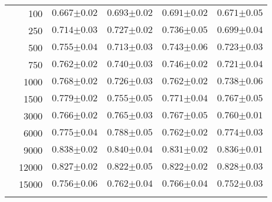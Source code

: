 \begin{landscape}
\begin{table}[p]
\begin{tabular}{cr| *{4}{C{2cm}}}
        & 100 & $0.667{\scriptscriptstyle\pm0.02}$ & $0.693{\scriptscriptstyle\pm0.02}$ & $0.691{\scriptscriptstyle\pm0.02}$ & $0.671{\scriptscriptstyle\pm0.05}$ \\
        & 250 & $0.714{\scriptscriptstyle\pm0.03}$ & $0.727{\scriptscriptstyle\pm0.02}$ & $0.736{\scriptscriptstyle\pm0.05}$ & $0.699{\scriptscriptstyle\pm0.04}$ \\
        & 500 & $0.755{\scriptscriptstyle\pm0.04}$ & $0.713{\scriptscriptstyle\pm0.03}$ & $0.743{\scriptscriptstyle\pm0.06}$ & $0.723{\scriptscriptstyle\pm0.03}$ \\
        & 750 & $0.762{\scriptscriptstyle\pm0.02}$ & $0.740{\scriptscriptstyle\pm0.03}$ & $0.746{\scriptscriptstyle\pm0.02}$ & $0.721{\scriptscriptstyle\pm0.04}$ \\
        & 1000 & $0.768{\scriptscriptstyle\pm0.02}$ & $0.726{\scriptscriptstyle\pm0.03}$ & $0.762{\scriptscriptstyle\pm0.02}$ & $0.738{\scriptscriptstyle\pm0.06}$ \\
        & 1500 & $0.779{\scriptscriptstyle\pm0.02}$ & $0.755{\scriptscriptstyle\pm0.05}$ & $0.771{\scriptscriptstyle\pm0.04}$ & $0.767{\scriptscriptstyle\pm0.05}$ \\
        & 3000 & $0.766{\scriptscriptstyle\pm0.02}$ & $0.765{\scriptscriptstyle\pm0.03}$ & $0.767{\scriptscriptstyle\pm0.05}$ & $0.760{\scriptscriptstyle\pm0.01}$ \\
        & 6000 & $0.775{\scriptscriptstyle\pm0.04}$ & $0.788{\scriptscriptstyle\pm0.05}$ & $0.762{\scriptscriptstyle\pm0.02}$ & $0.774{\scriptscriptstyle\pm0.03}$ \\
        & 9000 & $0.838{\scriptscriptstyle\pm0.02}$ & $0.840{\scriptscriptstyle\pm0.04}$ & $0.831{\scriptscriptstyle\pm0.02}$ & $0.836{\scriptscriptstyle\pm0.01}$ \\
        & 12000 & $0.827{\scriptscriptstyle\pm0.02}$ & $0.822{\scriptscriptstyle\pm0.05}$ & $0.822{\scriptscriptstyle\pm0.02}$ & $0.828{\scriptscriptstyle\pm0.03}$ \\
        & 15000 & $0.756{\scriptscriptstyle\pm0.06}$ & $0.762{\scriptscriptstyle\pm0.04}$ & $0.766{\scriptscriptstyle\pm0.04}$ & $0.752{\scriptscriptstyle\pm0.03}$ \\

    \end{tabular}
\end{table}
\end{landscape}

